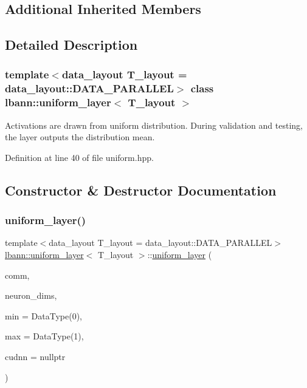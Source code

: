 \subsection*{Additional Inherited Members}


\subsection{Detailed Description}
\subsubsection*{template$<$data\+\_\+layout T\+\_\+layout = data\+\_\+layout\+::\+D\+A\+T\+A\+\_\+\+P\+A\+R\+A\+L\+L\+EL$>$\newline
class lbann\+::uniform\+\_\+layer$<$ T\+\_\+layout $>$}

Activations are drawn from uniform distribution. During validation and testing, the layer outputs the distribution mean. 

Definition at line 40 of file uniform.\+hpp.



\subsection{Constructor \& Destructor Documentation}
\mbox{\label{classlbann_1_1uniform__layer_a9ed147e3edd3d4556d0130a77a790f08}} 
\subsubsection{\texorpdfstring{uniform\+\_\+layer()}{uniform\_layer()}}
{\footnotesize\ttfamily template$<$data\+\_\+layout T\+\_\+layout = data\+\_\+layout\+::\+D\+A\+T\+A\+\_\+\+P\+A\+R\+A\+L\+L\+EL$>$ \\
\hyperlink{classlbann_1_1uniform__layer}{lbann\+::uniform\+\_\+layer}$<$ T\+\_\+layout $>$\+::\hyperlink{classlbann_1_1uniform__layer}{uniform\+\_\+layer} (\begin{DoxyParamCaption}\item[{\hyperlink{classlbann_1_1lbann__comm}{lbann\+\_\+comm} $\ast$}]{comm,  }\item[{const std\+::vector$<$ int $>$ \&}]{neuron\+\_\+dims,  }\item[{Data\+Type}]{min = {\ttfamily DataType(0)},  }\item[{Data\+Type}]{max = {\ttfamily DataType(1)},  }\item[{\hyperlink{classlbann_1_1cudnn_1_1cudnn__manager}{cudnn\+::cudnn\+\_\+manager} $\ast$}]{cudnn = {\ttfamily nullptr} }\end{DoxyParamCaption})\hspace{0.3cm}{\ttfamily [inline]}}



